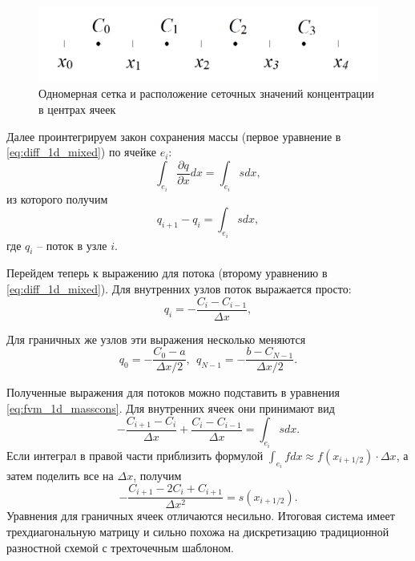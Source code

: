 \documentclass[a4paper, 11pt]{article}
\begin{document}
\begin{figure}[h] \centering
	\includegraphics[scale=0.4]{fvm_1d}
	\caption{Одномерная сетка и расположение сеточных значений концентрации в центрах ячеек\label{pic:fvm_1d}}
\end{figure}

Далее проинтегрируем закон сохранения массы (первое уравнение в \eqref{eq:diff_1d_mixed}) по ячейке $e_i$:
\begin{equation}
\int_{e_i}
\frac{\partial q}{\partial x}dx = \int_{e_i}sdx,
\end{equation}
из которого получим
\begin{equation}\label{eq:fvm_1d_masscons}
q_{i+1} - q_i = \int_{e_i}sdx,
\end{equation}
где $q_i$ -- поток в узле $i$. 

Перейдем теперь к выражению для потока (второму уравнению в  \eqref{eq:diff_1d_mixed}). Для внутренних узлов поток выражается просто:
\begin{equation}
q_i = -\frac{C_i - C_{i-1}}{\Delta x},
\end{equation}

Для граничных же узлов эти выражения несколько меняются
\begin{equation}
q_0 = -\frac{C_0 - a}{\Delta x /2},~~q_{N-1} = -\frac{b - C_{N-1}}{\Delta x/2}.
\end{equation}

Полученные выражения для потоков можно подставить в уравнения \eqref{eq:fvm_1d_masscons}. Для внутренних ячеек они принимают вид
\begin{equation}
-\frac{C_{i+1} - C_{i}}{\Delta x} + \frac{C_i - C_{i-1}}{\Delta x} = \int_{e_i}sdx.
\end{equation}
Если интеграл в правой части приблизить формулой $\int_{e_i}fdx \approx f(x_{i+1/2}) \cdot\Delta x$, а затем поделить все на $\Delta x$, получим
\begin{equation}
-\frac{C_{i+1} - 2C_{i} + C_{i+1}}{\Delta x^2} = s(x_{i+1/2}).
\end{equation}
Уравнения для граничных ячеек отличаются несильно. Итоговая система имеет трехдиагональную матрицу и сильно похожа на дискретизацию традиционной разностной схемой с трехточечным шаблоном.
\end{document}
